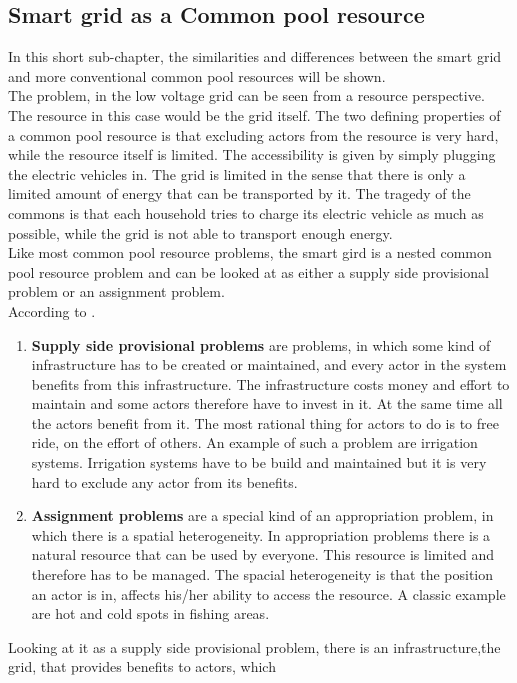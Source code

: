 \documentclass[a4paper]{article}
\begin{document}
\subsection{Smart grid as a Common pool resource}
In this short sub-chapter, the similarities and differences between the smart grid and more conventional common pool resources will be
shown.\\
The problem, in the low voltage grid can be seen from a resource perspective. 
The resource in this case would be the grid itself. 
The two defining properties of a common pool resource is that excluding actors from the resource is very hard, while the resource
itself is limited. 
The accessibility is given by simply plugging the electric vehicles in. 
The grid is limited in the sense that there is only a limited amount of energy that can be transported by it. 
The tragedy of the commons is that each household tries to charge its electric vehicle as much as possible, while the grid is 
not able to transport enough energy.\\
Like most common pool resource problems, the smart gird is a nested common pool resource problem and can be looked at as either a supply
side provisional problem or an assignment problem. \\
According to \cite{cprbook}.
\begin{enumerate}
 \item \textbf{Supply side provisional problems} are problems, in which some kind of 
infrastructure has to be created or maintained, and every actor in  the system benefits from this infrastructure. 
The infrastructure costs money and effort to maintain and some actors therefore have to invest in it. 
At the same time all the actors benefit from it. 
The most rational thing for actors to do is to free ride, on the effort of others. An example of such a problem are irrigation 
systems. Irrigation systems have to be build and maintained but it is very hard to exclude any actor from its benefits. 
\item \textbf{Assignment problems} are a special kind of an appropriation problem, in which there is a spatial heterogeneity. 
In appropriation problems there is a natural resource that can be used by everyone. This resource is limited and therefore has to be
managed. The spacial heterogeneity is that the position an actor is in, affects his/her ability to access the resource. A classic 
example are hot and cold spots in fishing areas.
\end{enumerate}
Looking at it as a supply side provisional problem, there is an infrastructure,the grid, that provides benefits to actors, which
\end{document}
